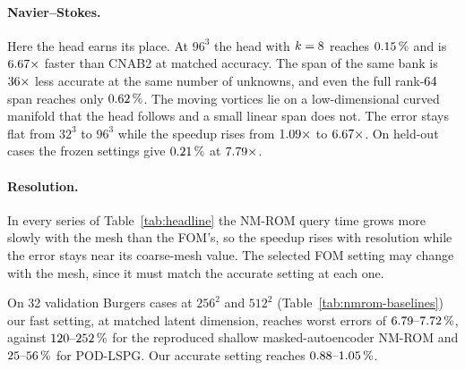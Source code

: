 \documentclass{article}
\begin{document}
\paragraph{Navier--Stokes.}
Here the head earns its place. At $96^3$ the head with $k=8$
reaches $0.15\,\%$ and is $6.67\times$ faster than CNAB2 at
matched accuracy. The span of the same bank is
$36\times$ less accurate at the same number of unknowns, and
even the full rank-$64$ span reaches only $0.62\,\%$.
The moving vortices lie on a low-dimensional curved manifold that the
head follows and a small linear span does not. The error stays flat from
$32^3$ to $96^3$ while the speedup rises from $1.09\times$ to
$6.67\times$. On \nNsHoldCases{} held-out cases the frozen settings
give $0.21\,\%$ at $7.79\times$.

\paragraph{Resolution.}
In every series of Table~\ref{tab:headline} the NM-ROM query time grows
more slowly with the mesh than the FOM's, so the speedup rises with
resolution while the error stays near its coarse-mesh value. The selected
FOM setting may change with the mesh, since it must match the accurate
setting at each one.

\begin{table}[t]
\centering
\caption{Other nonlinear-manifold ROMs on the shared Burgers 2D family at
$256^2$ and $512^2$: worst and median evolved same-grid error over 32
validation cases (never used for any choice) and compiled-query memory,
one allocation. Latent dimension is matched for the baselines and our fast
setting. The shallow masked-autoencoder NM-LSPG of
\citet{KimChoi2022NMROM} passed its reproduction gate on the third of
three pre-registered attempts; its hyper-reduction was not reproduced, and
its published encoder width does not fit our devices, so at $512^2$ its
width-capped encoder is limited by training time
(Table~\ref{tab:nmrom-baselines-appx}, which also states the data-matched
row and the residual path). Every row here, ours included, uses a dense
residual, so no times are given.}
\label{tab:nmrom-baselines}
\resizebox{\linewidth}{!}{}
\end{table}

On 32 validation Burgers cases at $256^2$ and $512^2$
(Table~\ref{tab:nmrom-baselines}) our fast setting, at matched latent
dimension, reaches worst errors of $6.79\mbox{--}7.72\,\%$, against
$120\mbox{--}252\,\%$ for the reproduced shallow masked-autoencoder NM-ROM
and $25\mbox{--}56\,\%$ for POD-LSPG. Our accurate setting reaches
$0.88\mbox{--}1.05\,\%$. 
\end{document}
